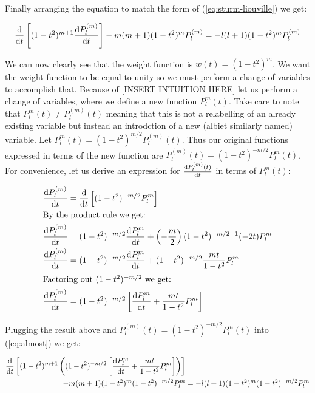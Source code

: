 \documentclass{article}
\begin{document}
    Finally arranging the equation to match the form of (\ref{eq:sturm-liouville}) we get:

    \begin{equation}
        \label{eq:almost}
        \odv{}{t}\left[ (1 - t^2)^{m + 1}\odv{P^{(m)}_{l}}{t} \right] -m(m + 1)(1 - t^2)^{m}P^{(m)}_l = -l(l + 1)(1 - t^2)^{m}P^{(m)}_{l}
    \end{equation}

    We can now clearly see that the weight function is $w(t) = (1 - t^2)^{m}$. We want the weight function to be equal to unity so we must perform a change of variables
    to accomplish that. Because of [INSERT INTUITION HERE] let us perform a change of variables, where we define a new function $P^{m}_{l}(t)$. Take care to note that
    $P^{m}_l(t) \neq P^{(m)}_{l}(t)$ meaning that this is not a relabelling of an already existing variable but instead an introdction of a new (albiet similarly named) variable.
    Let $P^{m}_{l}(t) = (1 - t^2)^{m/2}P^{(m)}_{l}(t)$. Thus our original functions expressed in terms of the new function are $P^{(m)}_{l}(t) = (1 - t^2)^{-m/2}P^{m}_l(t)$. For convenience,
    let us derive an expression for $\odv{P^{(m)}_{l}(t)}{t}$ in terms of $P^{m}_{l}(t)$:

    \begin{align}
        \odv{P^{(m)}_{l}}{t} &= \odv{}{t}\left[ (1 - t^2)^{-m/2}P^{m}_{l} \right] \\
        \intertext{By the product rule we get:}
        \odv{P^{(m)}_{l}}{t} &= (1 - t^2)^{-m/2}\odv{P^{m}_{l}}{t} + \left( -\frac{m}{2} \right)(1 - t^2)^{-m/2 - 1}(-2t)P^{m}_{l} \\
        \odv{P^{(m)}_{l}}{t} &= (1 - t^2)^{-m/2}\odv{P^{m}_{l}}{t} + (1 - t^2)^{-m/2}\frac{mt}{1 - t^2}P^{m}_{l} \\
        \intertext{Factoring out $(1 - t^2)^{-m/2}$ we get:}
        \odv{P^{(m)}_{l}}{t} &= (1 - t^2)^{-m/2}\left[\odv{P^{m}_{l}}{t} + \frac{mt}{1 - t^2}P^{m}_{l}\right]
    \end{align}
    
    Plugging the result above and $P^{(m)}_{l}(t) = (1 - t^2)^{-m/2}P^{m}_{l}(t)$ into (\ref{eq:almost}) we get:

    \begin{equation}
        \begin{aligned}
            \odv{}{t}\left[ (1 - t^2)^{m + 1}\left( (1 - t^2)^{-m/2}\left[\odv{P^{m}_{l}}{t} + \frac{mt}{1 - t^2}P^{m}_{l}\right] \right)\right]& \\
            - m(m + 1)(1 - t^2)^{m}(1 - t^2)^{-m/2}P^{m}_{l} &= -l(l + 1)(1 - t^2)^{m}(1 - t^2)^{-m/2}P^{m}_{l}
        \end{aligned}
    \end{equation}
\end{document}
